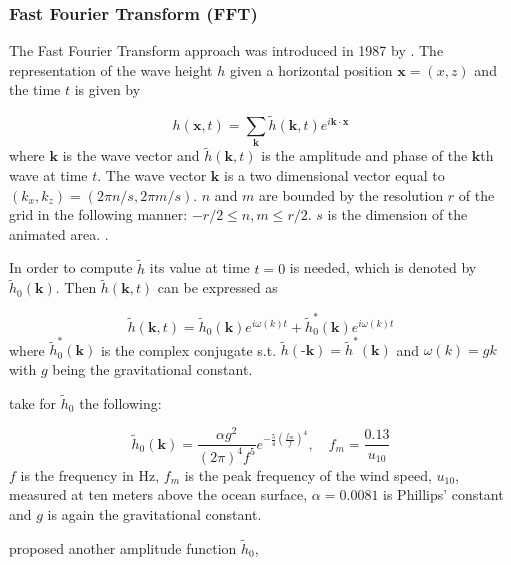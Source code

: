 \subsubsection{Fast Fourier Transform (FFT)}\label{subsub:fft}


The Fast Fourier Transform approach was introduced in 1987 by
\citeauthor{mastin1987fourier} \autocite{mastin1987fourier}. The representation
of the wave height $h$ given a horizontal position $\textbf{x} = (x,z)$ and the
time $t$ is given by

\begin{equation}
    h(\textbf{x}, t) = \sum_{\textbf{k}}^{} \tilde{h}(\textbf{k},
    t)e^{i\textbf{k}\cdot\textbf{x}}
\end{equation}
%
where $\textbf{k}$ is the wave vector and $\tilde{h}(\textbf{k}, t)$ is the
amplitude and phase of the $\textbf{k}$th wave at time $t$. The wave vector
$\textbf{k}$ is a two dimensional vector equal to $(k_x, k_z) = (2\pi n/s, 2\pi
m / s)$. $n$ and $m$ are bounded by the resolution $r$ of the grid in the
following manner: $-r/2 \leq n,m \leq r/2$. $s$ is the dimension of the animated
area.  \autocite{jensen2001deep,darles2011survey}.

In order to compute $\tilde{h}$ its value at time $t=0$ is needed, which is
denoted by $\tilde{h}_0(\textbf{k})$.  Then $\tilde{h}(\textbf{k}, t)$ can be
expressed as

\begin{equation}
    \tilde{h}(\textbf{k}, t) = \tilde{h}_0(\textbf{k}) e^{i\omega(k)t} +
    \tilde{h}_0^*(\textbf{k}) e^{i\omega(k)t}
\end{equation}
%
where $\tilde{h}_0^*(\textbf{k})$ is the complex conjugate s.t.
$\tilde{h}(\textbf{-k})=\tilde{h}^*(\textbf{k})$ and $\omega(k)=gk$ with $g$
being the gravitational constant.

\citeauthor{mastin1987fourier} take for $\tilde{h}_0$ the following:

\begin{equation}
    \tilde{h}_0(\textbf{k}) = \frac{\alpha g^2}{{(2\pi)}^4 f^5}
    e^{-\frac{5}{4}{(\frac{f_m}{f})}^4}, \quad f_m=\frac{0.13}{u_{10}}
\end{equation}
%
$f$ is the frequency in Hz, $f_m$ is the peak frequency of the wind speed,
$u_{10}$, measured at ten meters above the ocean surface, $\alpha=0.0081$ is
Phillips' constant and $g$ is again the gravitational constant.

\citeauthor{tessendorf2001simulating} proposed another amplitude function
$\tilde{h}_0$, 

